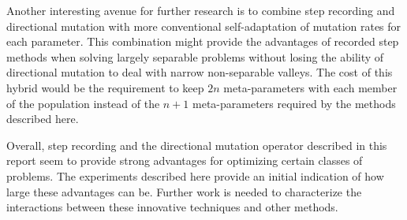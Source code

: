 \documentclass[12pt, titlepage]{article}
\begin{document}
Another interesting avenue for further research is to combine step
recording and directional mutation with more conventional
self-adaptation of mutation rates for each parameter.  This
combination might provide the advantages of recorded step methods when
solving largely separable problems without losing the ability of
directional mutation to deal with narrow non-separable valleys.  The
cost of this hybrid would be the requirement to keep $2n$
meta-parameters with each member of the population instead of the
$n+1$ meta-parameters required by the methods described here.

Overall, step recording and the directional mutation operator
described in this report seem to provide strong advantages for
optimizing certain classes of problems.  The experiments described
here provide an initial indication of how large these advantages can
be.  Further work is needed to characterize the interactions between
these innovative techniques and other methods.

\newpage

\end{document}
